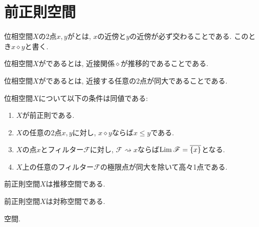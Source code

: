 \documentclass[uplatex, dvipdfmx, a4paper, 12pt, class=jsbook, crop=false]{standalone}
\begin{document}
\section{前正則空間}
\label{sec:preregular-spaces}

\newcommand{\topnear}{\mathrel{\diamond}}
\newcommand{\convto}{\rightsquigarrow}
\newcommand{\Llim}{\mathop{\mathrm{Lim}}\nolimits}

\begin{definition}
	位相空間$ X $の2点$ x, y $がとは, $ x $の近傍と$ y $の近傍が必ず交わることである. このとき$ x \topnear y $と書く.
\end{definition}

\begin{definition}
	位相空間$ X $がであるとは, 近接関係$ \topnear $が推移的であることである.
\end{definition}

\begin{definition}
	位相空間$ X $がであるとは, 近接する任意の2点が同大であることである.
\end{definition}

\begin{proposition}
	位相空間$ X $について以下の条件は同値である:
	\begin{enumerate}
		\item $ X $が前正則である.
		\item $ X $の任意の2点$ x, y $に対し, $ x \topnear y $ならば$ x \leq y $である.
		\item $ X $の点$ x $とフィルター$ \mathscr{F} $に対し, $ \mathscr{F} \convto x $ならば$ \Llim \mathscr{F} = \topbar{\{x\}} $となる.
		\item $ X $上の任意のフィルター$ \mathscr{F} $の極限点が同大を除いて高々1点である.
	\end{enumerate}
\end{proposition}

\begin{proposition}
	前正則空間$ X $は推移空間である.
\end{proposition}

\begin{proposition}
	前正則空間$ X $は対称空間である.
\end{proposition}

\begin{example}
	\Sierpinski 空間.
\end{example}
\end{document}
